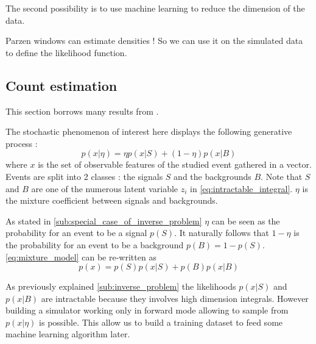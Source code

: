 
The second possibility is to use machine learning to reduce the dimension of the data.


Parzen windows can estimate densities !
So we can use it on the simulated data to define the likelihood function.







\subsection{Count estimation} %
\label{sub:count_estimation}

This section borrows many results from \cite{Neal:2007zz}.

The stochastic phenomenon of interest here displays the following generative process :
\begin{equation}
	\label{eq:mixture_model}
	p(x|\eta) = \eta p(x|S) + (1-\eta) p(x|B)
\end{equation}
where $x$ is the set of observable features of the studied event gathered in a vector.
Events are split into 2 classes : the signals $S$ and the backgrounds $B$.
Note that $S$ and $B$ are one of the numerous latent variable $z_i$ in \autoref{eq:intractable_integral}.
$\eta$ is the mixture coefficient between signals and backgrounds.

As stated in \autoref{sub:special_case_of_inverse_problem} $\eta$ can be seen as the probability for an event to be a signal $p(S)$. 
It naturally follows that $1-\eta$ is the probability for an event to be a background $p(B)=1-p(S)$.
\autoref{eq:mixture_model} can be re-written as
\begin{equation}
	p(x) = p(S)p(x|S) + p(B)p(x|B)
\end{equation}

As previously explained \autoref{sub:inverse_problem} the likelihoods $p(x|S)$ and $p(x|B)$ are intractable because they involves high dimension integrals.
However building a simulator working only in forward mode allowing to sample from $p(x|\eta)$ is possible.
This allow us to build a training dataset to feed some machine learning algorithm later.


